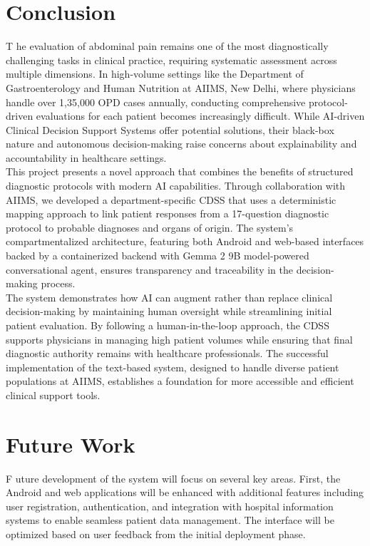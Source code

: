 \section{Conclusion}
\lettrine{T}{ }he evaluation of abdominal pain remains one of the most diagnostically challenging tasks in clinical practice, requiring systematic assessment across multiple dimensions. In high-volume settings like the Department of Gastroenterology and Human Nutrition at AIIMS, New Delhi, where physicians handle over 1,35,000 OPD cases annually, conducting comprehensive protocol-driven evaluations for each patient becomes increasingly difficult. While AI-driven Clinical Decision Support Systems offer potential solutions, their black-box nature and autonomous decision-making raise concerns about explainability and accountability in healthcare settings.\\[\baselineskip]

\noindent This project presents a novel approach that combines the benefits of structured diagnostic protocols with modern AI capabilities. Through collaboration with AIIMS, we developed a department-specific CDSS that uses a deterministic mapping approach to link patient responses from a 17-question diagnostic protocol to probable diagnoses and organs of origin. The system's compartmentalized architecture, featuring both Android and web-based interfaces backed by a containerized backend with Gemma 2 9B model-powered conversational agent, ensures transparency and traceability in the decision-making process.\\[\baselineskip]

\noindent The system demonstrates how AI can augment rather than replace clinical decision-making by maintaining human oversight while streamlining initial patient evaluation. By following a human-in-the-loop approach, the CDSS supports physicians in managing high patient volumes while ensuring that final diagnostic authority remains with healthcare professionals. The successful implementation of the text-based system, designed to handle diverse patient populations at AIIMS, establishes a foundation for more accessible and efficient clinical support tools.

\section{Future Work}
\lettrine{F}{ }uture development of the system will focus on several key areas. First, the Android and web applications will be enhanced with additional features including user registration, authentication, and integration with hospital information systems to enable seamless patient data management. The interface will be optimized based on user feedback from the initial deployment phase.\\[\baselineskip]

